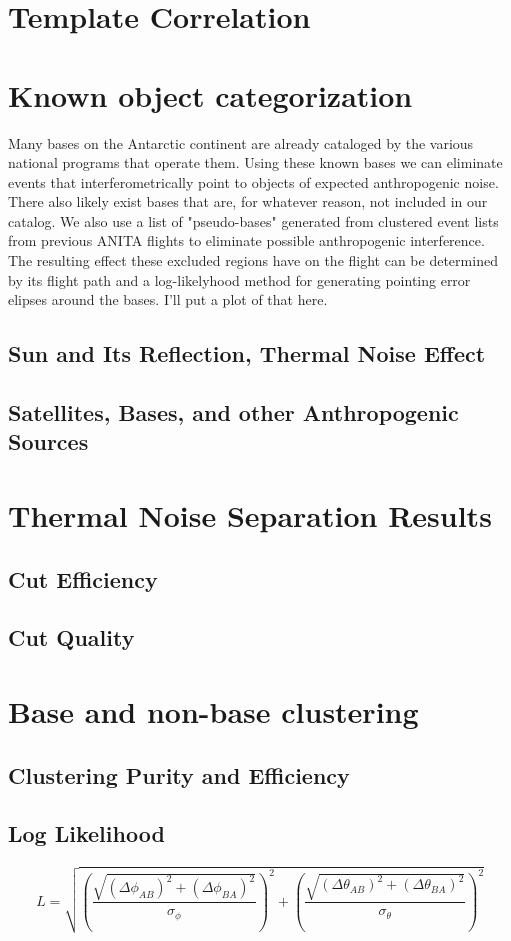 \section{Template Correlation}
	


\section{Known object categorization}
	Many bases on the Antarctic continent are already cataloged by the various national programs that operate them.  Using these known bases we can eliminate events that interferometrically point to objects of expected anthropogenic noise.  There also likely exist bases that are, for whatever reason, not included in our catalog.  We also use a list of "pseudo-bases" generated from clustered event lists from previous ANITA flights to eliminate possible anthropogenic interference.  The resulting effect these excluded regions have on the flight can be determined by its flight path and a log-likelyhood method for generating pointing error elipses around the bases.  I'll put a plot of that here.
	\subsection{Sun and Its Reflection, Thermal Noise Effect}
	\subsection{Satellites, Bases, and other Anthropogenic Sources}

\section{Thermal Noise Separation Results}
	\subsection{Cut Efficiency}
	\subsection{Cut Quality}




\section{Base and non-base clustering}
	\subsection{Clustering Purity and Efficiency}
	
	
	
	\subsection{Log Likelihood}
	
	\begin{equation}
L = \sqrt{(\frac{\sqrt{(\Delta\phi_{AB})^2+(\Delta\phi_{BA})^2}}{{\sigma_{\phi}}})^2+(\frac{\sqrt{(\Delta\theta_{AB})^2+(\Delta\theta_{BA})^2}}{{\sigma_{\theta}}})^2}
	\end{equation}
	
